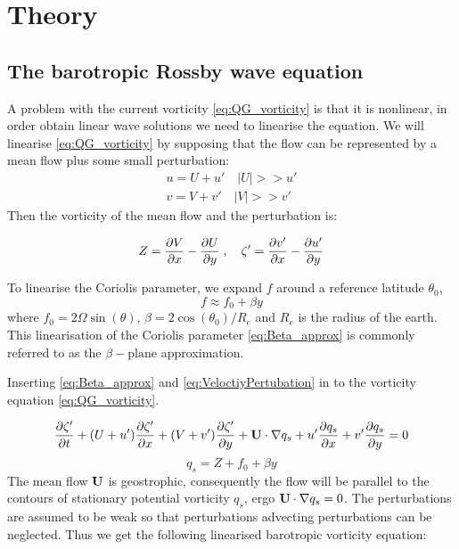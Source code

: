 \section{Theory}

\subsection{The barotropic Rossby wave equation}

A problem with the current vorticity \cref{eq:QG_vorticity} is
that it is nonlinear, in order obtain linear wave solutions we need to
linearise the equation. We will linearise \cref{eq:QG_vorticity} by supposing
that the flow can be represented by a mean flow plus some small perturbation:
\begin{equation}\label{eq:VeloctiyPertubation}
    \begin{split}
    u = U + u' \quad  |U| >> u' \\
    v = V + v' \quad  |V| >> v'
    \end{split}
\end{equation}
Then the vorticity of the mean flow and the perturbation is:

\begin{equation}\label{eq:VortPertubation}
    Z = \pdv{V}{x} - \pdv{U}{y} \; , \quad \zeta' = \pdv{v'}{x} - \pdv{u'}{y}
\end{equation}

To linearise the Coriolis parameter, we expand $f$
around a reference latitude $\theta_0$,
\begin{equation}\label{eq:Beta_approx}
    f \approx f_0 + \beta y
\end{equation}
where $f_0 = 2\Omega \sin(\theta)$, $\beta = 2\cos (\theta_0)/R_e$ and $R_e$ is
the radius of the earth. This linearisation of the Coriolis parameter
\cref{eq:Beta_approx} is commonly referred to as the $\beta-\mathrm{plane}$
approximation.

Inserting  \cref{eq:Beta_approx} and \cref{eq:VeloctiyPertubation} in to the
vorticity equation \cref{eq:QG_vorticity}.

\begin{equation}
    \pdv{\zeta'}{t} + (U+u')\pdv{\zeta'}{x} + (V+v')\pdv{\zeta'}{y} + \mathbf{U}
    \cdot \nabla q_s + u' \pdv{q_s}{x} + v' \pdv{q_s}{y} = 0
\end{equation}
\begin{equation}\label{eq:q_s}
    q_s = Z + f_0 + \beta y
\end{equation}
The mean flow $\mathbf{U}$ is geostrophic, consequently the flow will be parallel
to the contours of stationary potential vorticity $q_s$, ergo $\mathbf{U} \cdot
\nabla q_s = 0$. The perturbations are assumed to be weak so that perturbations
advecting perturbations can be neglected. Thus we get the following linearised
barotropic vorticity equation:

